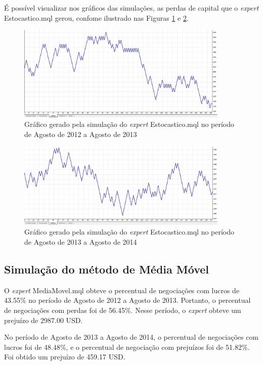 É possível visualizar nos gráficos das simulações, as perdas de capital que o \textit{expert} Estocastico.mql gerou, confome ilustrado nas Figuras \ref{protocoloEst3} e \ref{protocoloEst4}.

\begin{figure}[H]
\centering
\includegraphics[width=0.9\textwidth]{figuras/protocoloEst3}
\caption{Gráfico gerado pela simulação do \textit{expert} Estocastico.mql no período de Agosto de 2012 a Agosto de 2013} 
\label{protocoloEst3}
\end{figure}

\begin{figure}[H]
\centering
\includegraphics[width=0.9\textwidth]{figuras/protocoloEst4}
\caption{Gráfico gerado pela simulação do \textit{expert} Estocastico.mql no período de Agosto de 2013 a Agosto de 2014} 
\label{protocoloEst4}
\end{figure}

\subsection{Simulação do método de Média Móvel}

O \textit{expert} MediaMovel.mql obteve o percentual de negociações com lucros de 43.55\% no período de Agosto de 2012 a Agosto de 2013. Portanto, o percentual de negociações com perdas foi de 56.45\%. Nesse período, o \textit{expert} obteve um prejuízo de 2987.00 USD. 

No período de Agosto de 2013 a Agosto de  2014, o percentual de negociações com lucros foi de 48.48\%, e o percentual de negociação com prejuízos foi de 51.82\%.  Foi obtido um prejuízo de 459.17 USD. 

